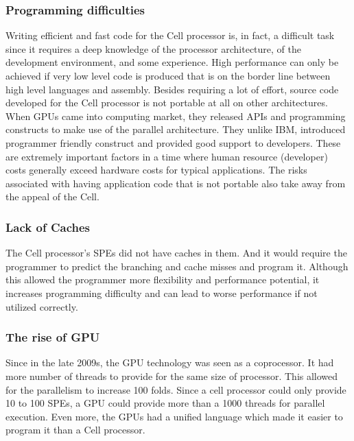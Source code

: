 \documentclass{sig-alternate-05-2015}
\begin{document}
\subsubsection{Programming difficulties}

Writing efficient and fast code for the Cell processor is, in fact, a difficult task since it requires a deep knowledge of the processor architecture, of the development environment, and some experience. High performance can only be achieved if very low level code is produced that is on the border line between high level languages and assembly. Besides requiring a lot of effort, source code developed for the Cell processor is not portable at all on other architectures. When GPUs came into computing market, they released APIs and programming constructs to make use of the parallel architecture. They unlike IBM, introduced programmer friendly construct and provided good support to developers. These are extremely important factors in a time where human resource (developer) costs generally exceed hardware costs for typical applications. The risks associated with having application code that is not portable also take away from the appeal of the Cell.  

\subsubsection{Lack of Caches} 
The Cell processor’s SPEs did not have caches in them. And it would require the programmer to predict the branching and cache misses and program it. Although this allowed the programmer more flexibility and performance potential, it increases programming difficulty and can lead to worse performance if not utilized correctly. 

\subsubsection{The rise of GPU}

Since in the late 2009s, the GPU technology was seen as a coprocessor. It had more number of threads to provide for the same size of processor. This allowed for the parallelism to increase 100 folds. Since a cell processor could only provide 10 to 100 SPEs, a GPU could provide more than a 1000 threads for parallel execution. Even more, the GPUs had a unified language which made it easier to program it than a Cell processor.



%
%
\end{document}
